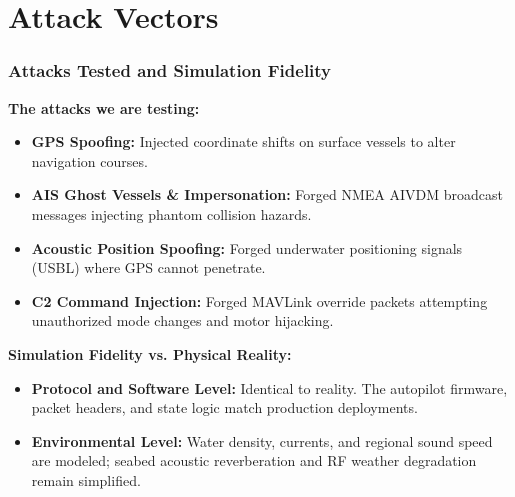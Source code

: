 \documentclass{beamer}
\begin{document}
\section{Attack Vectors}
\begin{frame}
\frametitle{\textbf{Attacks Tested and Simulation Fidelity}}
\small
\textbf{The attacks we are testing:}
\begin{itemize}
    \setlength\itemsep{0.15em}
    \item \textbf{GPS Spoofing:} Injected coordinate shifts on surface vessels to alter navigation courses.
    \item \textbf{AIS Ghost Vessels \& Impersonation:} Forged NMEA AIVDM broadcast messages injecting phantom collision hazards.
    \item \textbf{Acoustic Position Spoofing:} Forged underwater positioning signals (USBL) where GPS cannot penetrate.
    \item \textbf{C2 Command Injection:} Forged MAVLink override packets attempting unauthorized mode changes and motor hijacking.
\end{itemize}

\vspace{0.2cm}
\textbf{Simulation Fidelity vs. Physical Reality:}
\begin{itemize}
    \setlength\itemsep{0.15em}
    \item \textbf{Protocol and Software Level:} Identical to reality. The autopilot firmware, packet headers, and state logic match production deployments.
    \item \textbf{Environmental Level:} Water density, currents, and regional sound speed are modeled; seabed acoustic reverberation and RF weather degradation remain simplified.
\end{itemize}
\end{frame}

\end{document}
